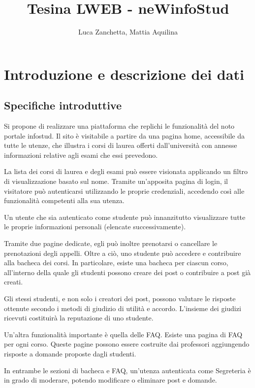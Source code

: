 \documentclass [a4paper,11pt]{book}
\begin{document}
\author{Luca Zanchetta, Mattia Aquilina}
\title{Tesina LWEB - neWinfoStud}
\maketitle
\tableofcontents

\chapter{Introduzione e descrizione dei dati}

\section{Specifiche introduttive}
\label{sec:specifiche}

Si propone di realizzare una piattaforma che replichi le funzionalità del noto portale infostud. Il sito è visitabile a partire da una pagina home, accessibile da tutte le utenze, che illustra i corsi di laurea offerti dall’università con annesse informazioni relative agli esami che essi prevedono.
  
La lista dei corsi di laurea e degli esami può essere visionata applicando un filtro di visualizzazione basato sul nome.
Tramite un’apposita pagina di login, il visitatore può autenticarsi utilizzando le proprie credenziali, accedendo così alle funzionalità competenti alla sua utenza.

Un utente che sia autenticato come studente può innanzitutto visualizzare tutte le proprie informazioni personali (elencate successivamente). 

Tramite due pagine dedicate, egli può inoltre prenotarsi o cancellare le prenotazioni degli appelli. Oltre a ciò, uno studente può accedere e contribuire alla bacheca dei corsi. In particolare, esiste una bacheca per ciascun corso, all’interno della quale gli studenti possono creare dei post o contribuire a post già creati. 

Gli stessi studenti, e non solo i creatori dei post, possono valutare le risposte ottenute secondo i metodi di giudizio di utilità e accordo. L’insieme dei giudizi ricevuti costituirà la reputazione di uno studente.

Un’altra funzionalità importante è quella delle FAQ. Esiste una pagina di FAQ per ogni corso. Queste pagine possono essere costruite dai professori aggiungendo risposte a domande proposte dagli studenti.

In entrambe le sezioni di bacheca e FAQ, un’utenza autenticata come Segreteria è in grado di moderare, potendo modificare o eliminare post e domande.
\end{document}
